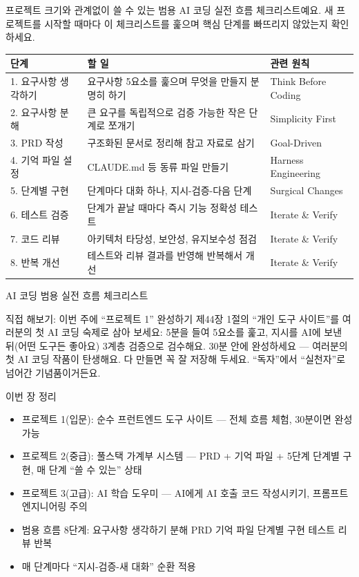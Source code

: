 프로젝트 크기와 관계없이 쓸 수 있는 범용 AI 코딩 실전 흐름 체크리스트예요. 새 프로젝트를 시작할 때마다 이 체크리스트를 훑으며 핵심 단계를 빠뜨리지 않았는지 확인하세요.

\begin{center}
\begin{tabularx}{\linewidth}{|X|X|X|}
\hline
\textbf{단계} & \textbf{할 일} & \textbf{관련 원칙} \tabularnewline
\hline
1. 요구사항 생각하기 & 요구사항 5요소를 훑으며 무엇을 만들지 분명히 하기 & Think Before Coding \tabularnewline
2. 요구사항 분해 & 큰 요구를 독립적으로 검증 가능한 작은 단계로 쪼개기 & Simplicity First \tabularnewline
3. PRD 작성 & 구조화된 문서로 정리해 참고 자료로 삼기 & Goal-Driven \tabularnewline
4. 기억 파일 설정 & CLAUDE.md 등 동류 파일 만들기 & Harness Engineering \tabularnewline
5. 단계별 구현 & 단계마다 대화 하나, 지시-검증-다음 단계 & Surgical Changes \tabularnewline
6. 테스트 검증 & 단계가 끝날 때마다 즉시 기능 정확성 테스트 & Iterate \& Verify \tabularnewline
7. 코드 리뷰 & 아키텍처 타당성, 보안성, 유지보수성 점검 & Iterate \& Verify \tabularnewline
8. 반복 개선 & 테스트와 리뷰 결과를 반영해 반복해서 개선 & Iterate \& Verify \tabularnewline
\hline
\end{tabularx}
\end{center}

\begin{center}\small\color{gray}AI 코딩 범용 실전 흐름 체크리스트\end{center}

\begin{tcbpractice}{직접 해보기: 이번 주에 “프로젝트 1” 완성하기}
제44장 1절의 “개인 도구 사이트”를 여러분의 첫 AI 코딩 숙제로 삼아 보세요: 5분을 들여 5요소를 훑고, 지시를 AI에 보낸 뒤(어떤 도구든 좋아요) 3계층 검증으로 검수해요. 30분 안에 완성하세요 — 여러분의 첫 AI 코딩 작품이 탄생해요. 다 만들면 꼭 잘 저장해 두세요. “독자”에서 “실천자”로 넘어간 기념품이거든요.

\end{tcbpractice}

\begin{tcbsummary}{이번 장 정리}
\begin{itemize}
  \item 프로젝트 1(입문): 순수 프런트엔드 도구 사이트 — 전체 흐름 체험, 30분이면 완성 가능
  \item 프로젝트 2(중급): 풀스택 가계부 시스템 — PRD + 기억 파일 + 5단계 단계별 구현, 매 단계 “쓸 수 있는” 상태
  \item 프로젝트 3(고급): AI 학습 도우미 — AI에게 AI 호출 코드 작성시키기, 프롬프트 엔지니어링 주의
  \item 범용 흐름 8단계: 요구사항 생각하기 분해 PRD 기억 파일 단계별 구현 테스트 리뷰 반복
  \item 매 단계마다 “지시-검증-새 대화” 순환 적용
\end{itemize}

\end{tcbsummary}
